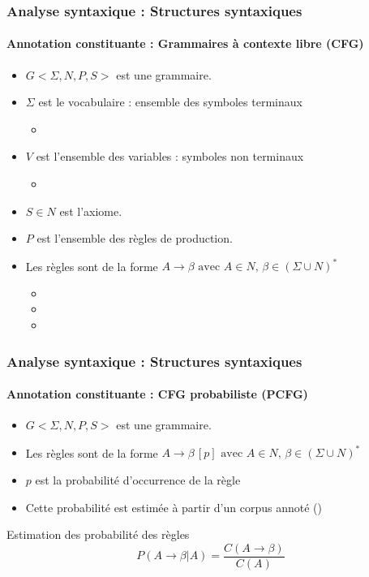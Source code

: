 \documentclass[xcolor=table]{beamer}
\begin{document}
\begin{frame}
\frametitle{Analyse syntaxique : Structures syntaxiques}
\framesubtitle{Annotation constituante : Grammaires à contexte libre (CFG)}

\begin{itemize}
	\item $G <\Sigma, N, P, S>$ est une grammaire.
	\item $\Sigma$ est le vocabulaire : ensemble des symboles terminaux
	\begin{itemize}
		\item {}
	\end{itemize}
	\item $V$ est l'ensemble des  variables : symboles non terminaux 
	\begin{itemize}
		\item {}
	\end{itemize}
	\item $S \in N$ est l'axiome.
	\item $P$ est l'ensemble des règles de production.
	\item Les règles sont de la forme $A \rightarrow \beta \text{ avec } A \in N,\, \beta \in (\Sigma \cup N)^*$
	\begin{itemize}
		\item {}
		\item {}
		\item {}
	\end{itemize}
\end{itemize}

\end{frame}

\begin{frame}
\frametitle{Analyse syntaxique : Structures syntaxiques}
\framesubtitle{Annotation constituante : CFG probabiliste (PCFG)}

\begin{itemize}
	\item $G <\Sigma, N, P, S>$ est une grammaire.
	\item Les règles sont de la forme $A \rightarrow \beta\, [p] \text{ avec } A \in N,\, \beta \in (\Sigma \cup N)^*$
	\item $p$ est la probabilité d'occurrence de la règle
	\item Cette probabilité est estimée à partir d'un corpus annoté ()
\end{itemize}

\begin{block}{Estimation des probabilité des règles}
	\[
	P(A \rightarrow \beta | A) = \frac{C(A \rightarrow \beta)}{C(A)}
	\]
\end{block}

\end{frame}
\end{document}

